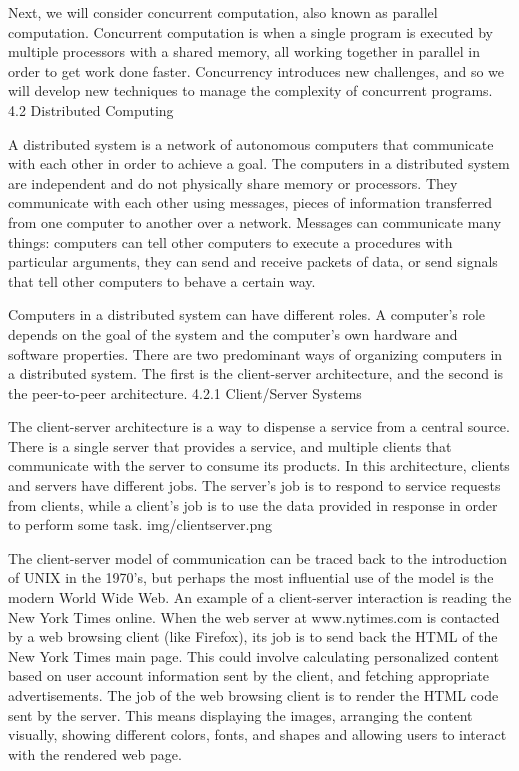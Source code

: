 \documentclass[letterpaper,10pt,dvipdfmx]{sphinxmanual}
\begin{document}
Next, we will consider concurrent computation, also known as parallel computation. Concurrent computation is when a single program is executed by multiple processors with a shared memory, all working together in parallel in order to get work done faster. Concurrency introduces new challenges, and so we will develop new techniques to manage the complexity of concurrent programs.
4.2   Distributed Computing

A distributed system is a network of autonomous computers that communicate with each other in order to achieve a goal. The computers in a distributed system are independent and do not physically share memory or processors. They communicate with each other using messages, pieces of information transferred from one computer to another over a network. Messages can communicate many things: computers can tell other computers to execute a procedures with particular arguments, they can send and receive packets of data, or send signals that tell other computers to behave a certain way.

Computers in a distributed system can have different roles. A computer's role depends on the goal of the system and the computer's own hardware and software properties. There are two predominant ways of organizing computers in a distributed system. The first is the client-server architecture, and the second is the peer-to-peer architecture.
4.2.1   Client/Server Systems

The client-server architecture is a way to dispense a service from a central source. There is a single server that provides a service, and multiple clients that communicate with the server to consume its products. In this architecture, clients and servers have different jobs. The server's job is to respond to service requests from clients, while a client's job is to use the data provided in response in order to perform some task.
img/clientserver.png

The client-server model of communication can be traced back to the introduction of UNIX in the 1970's, but perhaps the most influential use of the model is the modern World Wide Web. An example of a client-server interaction is reading the New York Times online. When the web server at www.nytimes.com is contacted by a web browsing client (like Firefox), its job is to send back the HTML of the New York Times main page. This could involve calculating personalized content based on user account information sent by the client, and fetching appropriate advertisements. The job of the web browsing client is to render the HTML code sent by the server. This means displaying the images, arranging the content visually, showing different colors, fonts, and shapes and allowing users to interact with the rendered web page.
\end{document}
